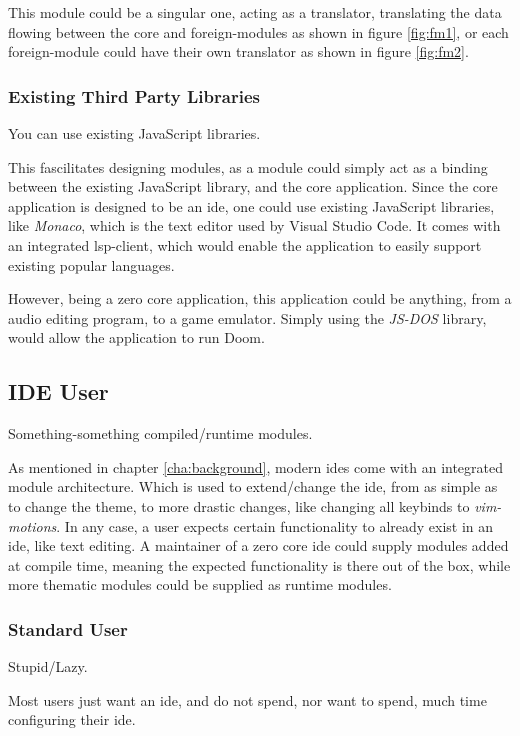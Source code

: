 This module could be a singular one, acting as a translator, translating the
data flowing between the core and foreign-modules as shown in figure
\ref{fig:fm1}, or each foreign-module could have their own translator as shown
in figure \ref{fig:fm2}.

\subsubsection{Existing Third Party Libraries}

You can use existing JavaScript libraries.

This fascilitates designing modules, as a module could simply act as a binding
between the existing JavaScript library, and the core application. Since the
core application is designed to be an \gls{ide}, one could use existing
JavaScript libraries, like \textit{Monaco}, which is the text editor used by
Visual Studio Code. It comes with an integrated \gls{lsp}-client, which would
enable the application to easily support existing popular languages.

However, being a zero core application, this application could be anything, from
a audio editing program, to a game emulator. Simply using the \textit{JS-DOS}
library, would allow the application to run Doom.

\subsection{IDE User}

Something-something compiled/runtime modules.

As mentioned in chapter \ref{cha:background}, modern \gls{ide}s come with an
integrated module architecture. Which is used to extend/change the \gls{ide},
from as simple as to change the theme, to more drastic changes, like changing
all keybinds to \textit{vim-motions}. In any case, a user expects certain
functionality to already exist in an \gls{ide}, like text editing. A maintainer
of a zero core \gls{ide} could supply modules added at compile time, meaning the
expected functionality is there out of the box, while more thematic modules
could be supplied as runtime modules.

\subsubsection{Standard User}

Stupid/Lazy.

Most users just want an \gls{ide}, and do not spend, nor want to spend, much
time configuring their \gls{ide}.

